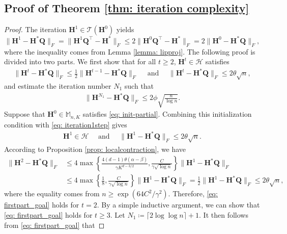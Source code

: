 \documentclass{article}
\theoremstyle{plain}
\theoremstyle{definition}
\theoremstyle{remark}
\newcommand{\BH}{\bm{H}}
\newcommand{\BQ}{\bm{Q}}
\newcommand{\HCal}{\mathcal{H}}
\newcommand{\TCal}{\mathcal{T}}
\begin{document}
\begin{appendix}
\begin{center}
\section{Proof of Theorem \ref{thm: iteration complexity}}		
		\begin{proof}
			The iteration $\BH^1 \in \TCal(\BH^0)$ yields 
			\begin{equation} \label{eq: iteration1step}
				\|\BH^1 - \BH^* \BQ\|_F = \|\BH^1 \BQ^\top - \BH^*\|_F  \le 2 \|\BH^0\BQ^\top - \BH^*\|_F = 2 \|\BH^0- \BH^*\BQ\|_F,
			\end{equation}
   where the inequality comes from Lemma \ref{lemma: lipproj}.
			The following proof is divided into two parts. We first show that for all $t \geq 2$, $\BH^t \in \HCal$ satisfies
			\begin{align} \label{eq: firstpart_goal}
				\| \BH^t - \BH^* \BQ \|_F \leq \frac{1}{2} \| \BH^{t-1} - \BH^*\BQ\|_F \quad \text{ and } \quad  \| \BH^t - \BH^* \BQ\|_F \leq 2 \theta \sqrt{n},
			\end{align}
			and estimate the iteration number $N_1$ such that
			\begin{align}\label{N1:pf-thm-1}
				\|\BH^{N_1} - \BH^* \BQ\|_F \le  2\phi\sqrt{\frac{n}{\log n}}.
			\end{align}
    Suppose that $\BH^0 \in \mathbb{M}_{n,K}$ satisfies \eqref{eq: init-partial}. Combining this initialization condition with \eqref{eq: iteration1step} gives
    \begin{align} \label{eq: h1bound}
        \BH^1 \in \HCal \quad \text{ and } \quad \| \BH^1 - \BH^*\BQ \|_F \leq 2 \theta \sqrt{n}.
    \end{align}
    According to Proposition \ref{prop: localcontraction}, we have
    \begin{align*}
        \| \BH^2 - \BH^* \BQ \|_F & \leq    4 \max \left\{\frac{4(d-1) \theta (\alpha - \beta)}{\gamma K^{d-3/2}},  \frac{C}{\gamma \sqrt{\log n}} \right\}  \| \BH^1 - \BH^* \BQ \|_F\\
        & \leq  4 \max \left\{ \frac{1}{8},  \frac{C}{\gamma \sqrt{\log n}}  \right\}  \| \BH^1 - \BH^* \BQ \|_F
        = \frac{1}{2} \| \BH^1 - \BH^* \BQ \|_F \leq 2\theta \sqrt{n},
    \end{align*}
where the equality comes from $n \geq \exp(64C^2/\gamma^2) $. Therefore, \eqref{eq: firstpart_goal} holds for $t=2$.  By a simple inductive argument, we can show that \eqref{eq: firstpart_goal} holds for $t\ge 3$. Let $N_1 \coloneqq \lceil 2\log\log n \rceil + 1$. It then follows from \eqref{eq: firstpart_goal} that

\end{proof}
\end{center}
\end{appendix}
\end{document}
